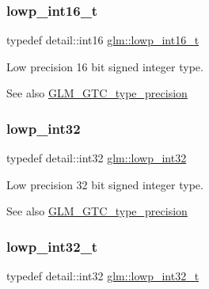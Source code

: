 \subsubsection{\texorpdfstring{lowp\+\_\+int16\+\_\+t}{lowp\_int16\_t}}
{\footnotesize\ttfamily typedef detail\+::int16 \hyperlink{group__gtc__type__precision_gae34c3d53c4c1434fc9f26538b0185667}{glm\+::lowp\+\_\+int16\+\_\+t}}

Low precision 16 bit signed integer type. \begin{DoxySeeAlso}{See also}
\hyperlink{group__gtc__type__precision}{G\+L\+M\+\_\+\+G\+T\+C\+\_\+type\+\_\+precision} 
\end{DoxySeeAlso}
\mbox{\label{group__gtc__type__precision_gad9939c9d6fec1c6accc02a83c6500f08}} 
\subsubsection{\texorpdfstring{lowp\+\_\+int32}{lowp\_int32}}
{\footnotesize\ttfamily typedef detail\+::int32 \hyperlink{group__gtc__type__precision_gad9939c9d6fec1c6accc02a83c6500f08}{glm\+::lowp\+\_\+int32}}

Low precision 32 bit signed integer type. \begin{DoxySeeAlso}{See also}
\hyperlink{group__gtc__type__precision}{G\+L\+M\+\_\+\+G\+T\+C\+\_\+type\+\_\+precision} 
\end{DoxySeeAlso}
\mbox{\label{group__gtc__type__precision_gad9567c806dc39f534174eef42663119d}} 
\subsubsection{\texorpdfstring{lowp\+\_\+int32\+\_\+t}{lowp\_int32\_t}}
{\footnotesize\ttfamily typedef detail\+::int32 \hyperlink{group__gtc__type__precision_gad9567c806dc39f534174eef42663119d}{glm\+::lowp\+\_\+int32\+\_\+t}}

